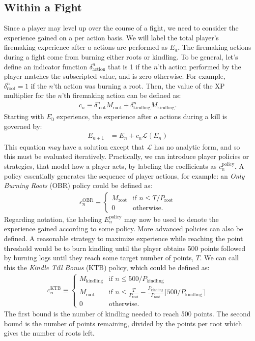 	\subsection{Within a Fight}
		Since a player may level up over the course of a fight, we need to consider the experience gained on a per action basis. We will label the total player's firemaking experience after $a$ actions are performed as $E_a$. The firemaking actions during a fight come from burning either roots or kindling. To be general, let's define an indicator function $\delta^n_\text{action}$ that is 1 if the $n$'th action performed by the player matches the subscripted value, and is zero otherwise. For example, $\delta^n_\text{root}=1$ if the $n$'th action was burning a root. Then, the value of the XP multiplier for the $n$'th firemaking action can be defined as:
		\begin{align}
			c_n \equiv \delta_\text{root}^n M_\text{root} + \delta_\text{kindling}^n M_\text{kindling}.
		\end{align}
		Starting with $E_0$ experience, the experience after $a$ actions during a kill is governed by:
		\begin{align}
			E_{n+1} &= E_{n} + c_n\mathcal{L}(E_{n})
		\end{align}
		This equation \emph{may} have a solution except that $\mathcal{L}$ has no analytic form, and so this must be evaluated iteratively. Practically, we can introduce player policies or strategies, that model how a player acts, by labeling the coefficients as $c_n^\text{policy}$. A policy essentially generates the sequence of player actions, for example: an \emph{Only Burning Roots} (OBR) policy could be defined as:
		\begin{align}
			c_n^\text{OBR} \equiv \begin{cases}
				M_\text{root} & \text{if } n \le T/P_\text{root}\\
				0 & \text{otherwise}.
			\end{cases}
		\end{align}
		Regarding notation, the labeling $E_{n}^\text{policy}$ may now be used to denote the experience gained according to some policy. More advanced policies can also be defined. A reasonable strategy to maximize experience while reaching the point threshold would be to burn kindling until the player obtains 500 points followed by burning logs until they reach some target number of points, $T$. We can call this the \emph{Kindle Till Bonus} (KTB) policy, which could be defined as:
		\begin{align}
			c_n^\text{KTB} \equiv \begin{cases}
				M_\text{kindling} &\text{if } n \le 500/P_\text{kindling}\\
				M_\text{root} &\text{if } n \le \frac{T}{P_\text{root}} - \frac{P_\text{kindling}}{P_\text{root}}\lceil 500/P_\text{kindling} \rceil \\
				0 & \text{otherwise}.
			\end{cases}
		\end{align}
		The first bound is the number of kindling needed to reach 500 points. The second bound is the number of points remaining, divided by the points per root which gives the number of roots left.


